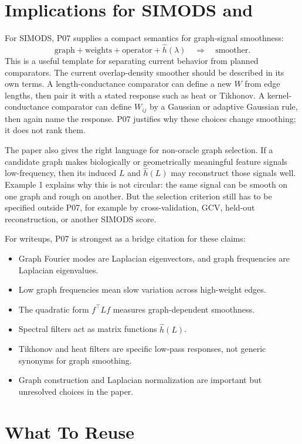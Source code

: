 \documentclass[11pt]{article}
\begin{document}
\section{Implications for SIMODS and }

For SIMODS, P07 supplies a compact semantics for graph-signal smoothness:
\[
  \text{graph} + \text{weights} + \text{operator} + \hat h(\lambda)
  \quad\Longrightarrow\quad
  \text{smoother}.
\]
This is a useful template for separating current behavior from planned
comparators.  The current  overlap-density smoother should be
described in its own terms.  A length-conductance comparator can define a new
$W$ from edge lengths, then pair it with a stated response such as heat or
Tikhonov.  A kernel-conductance comparator can define $W_{ij}$ by a Gaussian
or adaptive Gaussian rule, then again name the response.  P07 justifies why
these choices change smoothing; it does not rank them.

The paper also gives the right language for non-oracle graph selection.  If a
candidate graph makes biologically or geometrically meaningful feature
signals low-frequency, then its induced $L$ and $\hat h(L)$ may reconstruct
those signals well.  Example 1 explains why this is not circular: the same
signal can be smooth on one graph and rough on another.  But the selection
criterion still has to be specified outside P07, for example by
cross-validation, GCV, held-out reconstruction, or another SIMODS score.

For writeups, P07 is strongest as a bridge citation for these claims:
\begin{itemize}
  \item Graph Fourier modes are Laplacian eigenvectors, and graph
  frequencies are Laplacian eigenvalues.
  \item Low graph frequencies mean slow variation across high-weight edges.
  \item The quadratic form $f^\top Lf$ measures graph-dependent smoothness.
  \item Spectral filters act as matrix functions $\hat h(L)$.
  \item Tikhonov and heat filters are specific low-pass responses, not generic
  synonyms for graph smoothing.
  \item Graph construction and Laplacian normalization are important but
  unresolved choices in the paper.
\end{itemize}

\section{What To Reuse}
\end{document}
